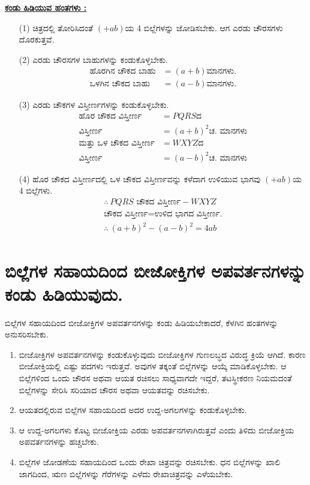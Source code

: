 \begin{enumerate}
\noindent
{\textbf{\underline{ಕಂಡು ಹಿಡಿಯುವ ಹಂತಗಳು :}}}
\begin{itemize}
\item[(1)] ಚಿತ್ರದಲ್ಲಿ ತೋರಿಸಿದಂತೆ $(+ab)$ಯ 4 ಬಿಲ್ಲೆಗಳನ್ನು ಜೋಡಿಸಬೇಕು. ಆಗ ಎರಡು ಚೌರಸಗಳು ದೊರಕುತ್ತವೆ. 
\item[(2)] ಎರಡು ಚೌರಸಗಳ ಬಾಹುಗಳನ್ನು ಕಂಡುಕೊಳ್ಳಬೇಕು.
\begin{align*}
\text{ಹೊರಗಿನ ಚೌಕದ ಬಾಹು} & = (a+b) \text{ಮಾನಗಳು.}\\
\text{ಒಳಗಿನ ಚೌಕದ ಬಾಹು} & = (a-b) \text{ಮಾನಗಳು.}
\end{align*}

\item[(3)] ಎರಡು ಚೌಕಗಳ ವಿಸ್ತೀರ್ಣಗಳನ್ನು ಕಂಡುಕೊಳ್ಳಬೇಕು. 
\begin{align*}
\text{ಹೊರ ಚೌಕದ ವಿಸ್ತೀರ್ಣ} & = PQRS\text{ದ}\\
 \text{ವಿಸ್ತೀರ್ಣ} & = (a+b)^2 \text{ಚ. ಮಾನಗಳು}\\
\text{ಮತ್ತು ಒಳ ಚೌಕದ ವಿಸ್ತೀರ್ಣ} & = WXYZ\text{ದ}\\
\text{ವಿಸ್ತೀರ್ಣ} & = (a-b)^2 \text{ಚ. ಮಾನಗಳು}
\end{align*}

\item[(4)] ಹೊರ ಚೌಕದ ವಿಸ್ತೀರ್ಣದಲ್ಲಿ ಒಳ ಚೌಕದ ವಿಸ್ತೀರ್ಣವನ್ನು ಕಳೆದಾಗ ಉಳಿಯುವ ಭಾಗವು $(+ab)$ಯ 4 ಬಿಲ್ಲೆಗಳು.
\begin{gather*}
\therefore~ PQRS \text{ ಚೌಕದ ವಿಸ್ತೀರ್ಣ} - WXYZ\\
 \text{ಚೌಕದ ವಿಸ್ತೀರ್ಣ}  = \text{ಉಳಿದ ಭಾಗದ ವಿಸ್ತೀರ್ಣ.}\\
\therefore~ (a+b)^2 - (a-b)^2 = 4ab
\end{gather*} 
\end{itemize}
\end{enumerate}

\section*{ಬಿಲ್ಲೆಗಳ ಸಹಾಯದಿಂದ ಬೀಜೋಕ್ತಿಗಳ ಅಪವರ್ತನಗಳನ್ನು ಕಂಡು ಹಿಡಿಯುವುದು.}

ಬಿಲ್ಲೆಗಳ ಸಹಾಯದಿಂದ ಬೀಜೋಕ್ತಿಗಳ ಅಪವರ್ತನಗಳನ್ನು ಕಂಡು ಹಿಡಿಯಬೇಕಾದರೆ, ಕೆಳಗಿನ ಹಂತಗಳನ್ನು ಅನುಸರಿಸಬೇಕು. 
\begin{enumerate}
\item ಬೀಜೋಕ್ತಿಗಳ ಅಪವರ್ತನಗಳನ್ನು ಕಂಡುಕೊಳ್ಳುವುದು ಬೀಜೋಕ್ತಿಗಳ ಗುಣಲಬ್ಧದ ವಿರುದ್ಧ ಕ್ರಿಯೆ ಆಗಿದೆ. ಕಾರಣ ಬೀಜೋಕ್ತಿಯಲ್ಲಿ ಎಷ್ಟು ಪದಗಳು ಇರುತ್ತವೆ. ಅವುಗಳ ತಕ್ಕಂತೆ ಬಿಲ್ಲೆಗಳನ್ನು ಆಯ್ಕೆ ಮಾಡಿಕೊಳ್ಳಬೇಕು. ಆ ಬಿಲ್ಲೆಗಳಿಂದ ಒಂದು ಚೌರಸ ಅಥವಾ ಆಯತ ರಚಿಸಲು ಸಾಧ್ಯವಾಗದೇ ಇದ್ದರೆ, ತಟಸ್ಥೀಕರಣ ನಿಯಮದಂತೆ ಬಿಲ್ಲೆಗಳನ್ನು ಸೇರಿಸಿ ಸರಿಯಾದ ಚೌರಸ ಅಥವಾ ಆಯತವನ್ನು ರಚಿಸಬೇಕು. 
\item ಆಯತದಲ್ಲಿರುವ ಬಿಲ್ಲೆಗಳ ಸಹಾಯದಿಂದ ಅದರ ಉದ್ದ-ಅಗಲಗಳನ್ನು ಕಂಡುಕೊಳ್ಳಬೇಕು. 

\item ಆ ಉದ್ದ-ಅಗಲಗಳು ಕೊಟ್ಟ ಬೀಜೋಕ್ತಿಯ ಎರಡು ಅಪವರ್ತನಗಳಾಗಿರುತ್ತವೆ ಎಂದು ತಿಳಿದು ಬೀಜೋಕ್ತಿಯ ಅಪವರ್ತನಗಳನ್ನು ಹಚ್ಚಬೇಕು.


\item ಬಿಲ್ಲೆಗಳ ಜೋಡಣೆಯ ಸಹಾಯದಿಂದ ಒಂದು ರೇಖಾ ಚಿತ್ರವನ್ನು ರಚಿಸಬೇಕು.  ಧನ ಬಿಲ್ಲೆಗಳನ್ನು ಖಾಲಿ ಜಾಗದಿಂದ, ಋಣ ಬಿಲ್ಲೆಗಳನ್ನು ಗೆರೆಗಳನ್ನು ಎಳೆದು ರೇಖಾಚಿತ್ರವನ್ನು ಎಳೆಯಬೇಕು.
\end{enumerate}

